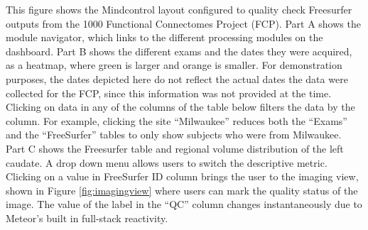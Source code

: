 \label{fig:dashboard}

This figure shows the Mindcontrol layout configured to quality check Freesurfer outputs from the 1000 Functional Connectomes Project (FCP). Part A shows the module navigator, which links to the different processing modules on the dashboard. Part B shows the different exams and the dates they were acquired, as a heatmap, where green is larger and orange is smaller. For demonstration purposes, the dates depicted here do not reflect the actual dates the data were collected for the FCP, since this information was not provided at the time. Clicking on data in any of the columns of the table below filters the data by the column. For example, clicking the site ``Milwaukee'' reduces both the ``Exams'' and the ``FreeSurfer'' tables to only show subjects who were from Milwaukee. Part C shows the Freesurfer table and regional volume distribution of the left caudate. A drop down menu allows users to switch the descriptive metric. Clicking on a value in FreeSurfer ID column brings the user to the imaging view, shown in Figure \ref{fig:imagingview} where users can mark the quality status of the image. The value of the label in the ``QC'' column changes instantaneously due to Meteor's built in full-stack reactivity. 
